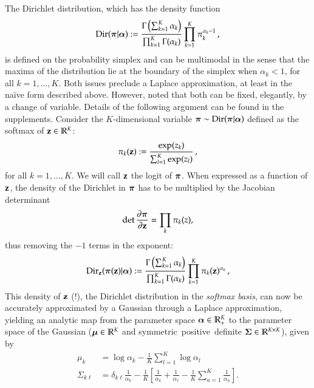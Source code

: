 The Dirichlet distribution, which has the density function
%
\begin{equation}\label{eq:dirichlet}
    \mathrm{Dir}(\boldsymbol{\pi} | {\boldsymbol{\alpha}}) := \frac{\Gamma \left( \sum_{k=1}^K \alpha_k \right)}{\prod_{k=1}^K \Gamma(\alpha_k)} \prod_{k=1}^K \pi_k^{\alpha_k-1} \, ,
\end{equation}
%
is defined on the probability simplex and can be multimodal in the sense that the maxima of the distribution lie at the boundary of the simplex when $\alpha_k < 1$, for all $k = 1, \dots, K$. Both issues preclude a Laplace approximation, at least in the na\"ive form described above. However, \citet{MacKay1998} noted that both can be fixed, elegantly, by a change of variable. Details of the following argument can be found in the supplements. Consider the $K$-dimensional variable $\boldsymbol{\pi} \sim \mathrm{Dir}(\boldsymbol{\pi} | {\boldsymbol{\alpha}})$ defined as the softmax of $\mathbf{z}\in\mathbb{R}^K$:
\begin{equation}
    \pi_k(\mathbf{z}) := \frac{\exp(z_k)}{\sum_{l=1}^K \exp(z_l)} \, ,
\end{equation}
%
for all $k = 1, \dots, K$. We will call $\mathbf{z}$ the logit of $\boldsymbol{\pi}$. When expressed as a function of $\mathbf{z}$, the density of the Dirichlet in $\boldsymbol{\pi}$ has to be multiplied by the Jacobian determinant
\begin{equation}
    \det \frac{\partial \boldsymbol{\pi}}{\partial \mathbf{z}}  = \prod_k \pi_k(z),
\end{equation}
thus removing the $-1$ terms in the exponent: %
\begin{equation}\label{eq:dirichlet_softmax}
    \mathrm{Dir}_{\mathbf{z}}(\boldsymbol{\pi}(\mathbf{z}) | {\boldsymbol{\alpha}}) := \frac{\Gamma \left( \sum_{k=1}^K \alpha_k \right)}{\prod_{k=1}^K \Gamma(\alpha_k)} \prod_{k=1}^K \pi_k(\mathbf{z})^{\alpha_k} \, ,
\end{equation}
This density of $\mathbf{z}$ (!), the Dirichlet distribution in the \emph{softmax basis}, can now be accurately approximated by a Gaussian through a Laplace approximation, yielding an analytic map from the parameter space ${\boldsymbol{\alpha}}\in\mathbb{R}_+ ^K$ to the parameter space of the Gaussian (${\boldsymbol{\mu}} \in\mathbb{R}^K$ and symmetric~positive~definite ${\boldsymbol{\Sigma}}\in\mathbb{R}^{K\times K}$), given by
\begin{align}
\mu_k &= \log \alpha_k  - \frac{1}{K} \sum_{l=1}^{K} \log \alpha_l \label{eq:mubridge}\\
\Sigma_{k\ell} &= \delta_{k\ell}\frac{1}{\alpha_k} - \frac{1}{K}\left[\frac{1}{\alpha_k} + \frac{1}{\alpha_\ell} - \frac{1}{K}\sum_{u=1} ^K \frac{1}{\alpha_u} \right]. \label{eq:Sigmabridge}
\end{align}
